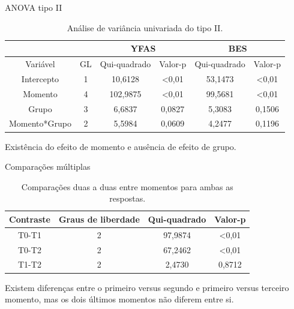 \documentclass[
  ignorenonframetext,
  serif,
  professionalfont,
  usenames,
  dvipsnames,
  aspectratio = 169]{beamer}
\begin{document}
\begin{frame}{ANOVA tipo II}
\protect\hypertarget{anova-tipo-ii}{}
\begin{table}[H]
\centering
\begin{tabular}{c|c|cc|cc}
\hline
              &                    & \multicolumn{2}{c|}{YFAS}     & \multicolumn{2}{c}{BES}       \\ \hline
Variável      & GL & Qui-quadrado & Valor-p        & Qui-quadrado & Valor-p        \\ \hline
Intercepto    & 1                  & 10,6128      & \textless 0,01 & 53,1473      & \textless 0,01 \\
Momento       & 4                  & 102,9875     & \textless 0,01 & 99,5681      & \textless 0,01 \\
Grupo         & 3                  & 6,6837       & 0,0827         & 5,3083       & 0,1506         \\
Momento*Grupo & 2                  & 5,5984       & 0,0609         & 4,2477       & 0,1196         \\ \hline
\end{tabular}
\caption{Análise de variância univariada do tipo II.}
\label{tab:anovaII}
\end{table}

Existência do efeito de momento e ausência de efeito de grupo.
\end{frame}

\begin{frame}{Comparações múltiplas}
\protect\hypertarget{comparauxe7uxf5es-muxfaltiplas}{}
\begin{table}[H]
\centering
\begin{tabular}{cccc}
\hline
Contraste & Graus de liberdade & Qui-quadrado & Valor-p        \\ \hline
T0-T1     & 2                  & 97,9874      & \textless 0,01 \\
T0-T2     & 2                  & 67,2462      & \textless 0,01 \\
T1-T2     & 2                  & 2,4730       & 0,8712         \\ \hline
\end{tabular}
\caption{Comparações duas a duas entre momentos para ambas as respostas.}
\label{tab:mul-multcomp1}
\end{table}

Existem diferenças entre o primeiro versus segundo e primeiro versus
terceiro momento, mas os dois últimos momentos não diferem entre si.
\end{frame}
\end{document}
